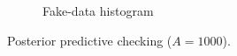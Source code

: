 \begin{figure}[htbp]
\begin{subfigure}[t]{0.37\textwidth}
  \caption{Fake-data histogram}
  \label{fig:fake-hist_a1000}
\end{subfigure}
\caption{Posterior predictive checking ($A=1000$).}
\label{fig:ppc-A1000}
\end{figure}


%




